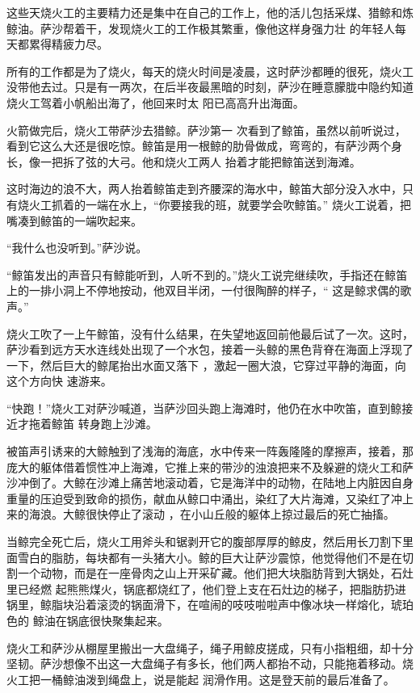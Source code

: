 \documentclass{article}
\begin{document}
这些天烧火工的主要精力还是集中在自己的工作上，他的活儿包括采煤、猎鲸和炼鲸油。萨沙帮着干，发现烧火工的工作极其繁重，像他这样身强力壮
的年轻人每天都累得精疲力尽。 

所有的工作都是为了烧火，每天的烧火时间是凌晨，这时萨沙都睡的很死，烧火工没带他去过。只是有一两次，在后半夜最黑暗的时刻，萨沙在睡意朦胧中隐约知道烧火工驾着小帆船出海了，他回来时太
阳已高高升出海面。 

火箭做完后，烧火工带萨沙去猎鲸。萨沙第一
\newpage
次看到了鲸笛，虽然以前听说过，看到它这么大还是很吃惊。鲸笛是用一根鲸的肋骨做成，弯弯的，有萨沙两个身长，像一把拆了弦的大弓。他和烧火工两人
抬着才能把鲸笛送到海滩。 

这时海边的浪不大，两人抬着鲸笛走到齐腰深的海水中，鲸笛大部分没入水中，只有烧火工抓着的一端在水上，“你要接我的班，就要学会吹鲸笛。”
烧火工说着，把嘴凑到鲸笛的一端吹起来。 


“我什么也没听到。”萨沙说。 

“鲸笛发出的声音只有鲸能听到，人听不到的。”烧火工说完继续吹，手指还在鲸笛上的一排小洞上不停地按动，他双目半闭，一付很陶醉的样子，“
这是鲸求偶的歌声。” 

烧火工吹了一上午鲸笛，没有什么结果，在失望地返回前他最后试了一次。这时，萨沙看到远方天水连线处出现了一个水包，接着一头鲸的黑色背脊在海面上浮现了一下，然后巨大的鲸尾抬出水面又落下
\newpage
，激起一圈大浪，它穿过平静的海面，向这个方向快
速游来。 

“快跑！”烧火工对萨沙喊道，当萨沙回头跑上海滩时，他仍在水中吹笛，直到鲸接近才拖着鲸笛
转身跑上沙滩。 

被笛声引诱来的大鲸触到了浅海的海底，水中传来一阵轰隆隆的摩擦声，接着，那庞大的躯体借着惯性冲上海滩，它推上来的带沙的浊浪把来不及躲避的烧火工和萨沙冲倒了。大鲸在沙滩上痛苦地滚动着，它是海洋中的动物，在陆地上内脏因自身重量的压迫受到致命的损伤，献血从鲸口中涌出，染红了大片海滩，又染红了冲上来的海浪。大鲸很快停止了滚动
，在小山丘般的躯体上掠过最后的死亡抽搐。 

当鲸完全死亡后，烧火工用斧头和锯剥开它的腹部厚厚的鲸皮，然后用长刀割下里面雪白的脂肪，每块都有一头猪大小。鲸的巨大让萨沙震惊，他觉得他们不是在切割一个动物，而是在一座骨肉之山上开采矿藏。他们把大块脂肪背到大锅处，石灶里已经燃
\newpage
起熊熊煤火，锅底都烧红了，他们登上支在石灶边的梯子，把脂肪扔进锅里，鲸脂块沿着滚烫的锅面滑下，在喧闹的吱吱啦啦声中像冰块一样熔化，琥珀色的
鲸油在锅底很快聚集起来。 

烧火工和萨沙从棚屋里搬出一大盘绳子，绳子用鲸皮搓成，只有小指粗细，却十分坚韧。萨沙想像不出这一大盘绳子有多长，他们两人都抬不动，只能拖着移动。烧火工把一桶鲸油泼到绳盘上，说是能起
润滑作用。这是登天前的最后准备了。 
\end{document}
